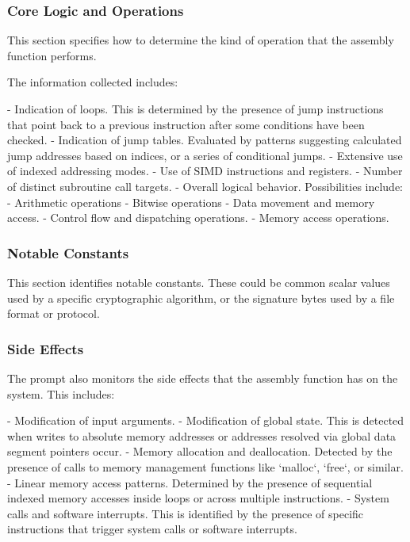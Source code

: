 \documentclass[conference,compsoc]{IEEEtran}
\begin{document}
\subsubsection{Core Logic and Operations}

This section specifies how to determine the kind of operation that the assembly function performs.

The information collected includes:

- Indication of loops. This is determined by the presence of jump instructions that point back to a
    previous instruction after some conditions have been checked.
- Indication of jump tables. Evaluated by patterns suggesting calculated jump addresses based on
    indices, or a series of conditional jumps.
- Extensive use of indexed addressing modes.
- Use of SIMD instructions and registers.
- Number of distinct subroutine call targets.
- Overall logical behavior. Possibilities include:
  - Arithmetic operations
  - Bitwise operations
  - Data movement and memory access.
  - Control flow and dispatching operations.
  - Memory access operations.

\subsubsection{Notable Constants}

This section identifies notable constants. These could be common scalar values used by a specific
cryptographic algorithm, or the signature bytes used by a file format or protocol.

\subsubsection{Side Effects}

The prompt also monitors the side effects that the assembly function has on the system. This includes:

- Modification of input arguments.
- Modification of global state.
    This is detected when writes to absolute memory addresses or addresses resolved via global data segment pointers occur.
- Memory allocation and deallocation.
    Detected by the presence of calls to memory management functions like `malloc`, `free`, or similar.
- Linear memory access patterns.
    Determined by the presence of sequential indexed memory accesses inside loops or across multiple instructions.
- System calls and software interrupts.
    This is identified by the presence of specific instructions that trigger system calls or software interrupts.
\end{document}
